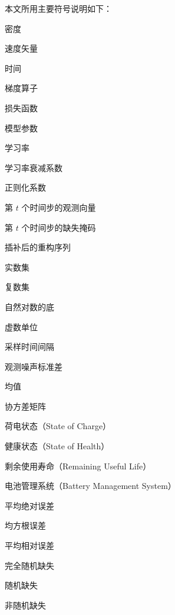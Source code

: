 
\makesymbolnotation

本文所用主要符号说明如下：

\begin{denotation}[2.8cm]
  \item[$\rho$]        密度
  \item[$\mathbf{v}$]  速度矢量
  \item[$t$]           时间
  \item[$\nabla$]      梯度算子
  \item[$\mathcal{L}$] 损失函数
  \item[$\theta$]      模型参数
  \item[$\alpha$]      学习率
  \item[$\eta$]        学习率衰减系数
  \item[$\lambda$]     正则化系数
  \item[$\mathbf{x}_t$] 第 $t$ 个时间步的观测向量
  \item[$\mathbf{m}_t$] 第 $t$ 个时间步的缺失掩码
  \item[$\hat{\mathbf{x}}$] 插补后的重构序列
  \item[$\mathbb{R}$]  实数集
  \item[$\mathbb{C}$]  复数集
  \item[$\mathrm{e}$]  自然对数的底
  \item[$\mathrm{i}$]  虚数单位
  \item[$\Delta t$]    采样时间间隔
  \item[$\sigma$]      观测噪声标准差
  \item[$\mu$]         均值
  \item[$\Sigma$]      协方差矩阵
  \item[$\mathrm{SOC}$] 荷电状态（State of Charge）
  \item[$\mathrm{SOH}$] 健康状态（State of Health）
  \item[$\mathrm{RUL}$] 剩余使用寿命（Remaining Useful Life）
  \item[$\mathrm{BMS}$] 电池管理系统（Battery Management System）
  \item[$\mathrm{MAE}$] 平均绝对误差
  \item[$\mathrm{RMSE}$] 均方根误差
  \item[$\mathrm{MRE}$] 平均相对误差
  \item[$\mathrm{MCAR}$] 完全随机缺失
  \item[$\mathrm{MAR}$]  随机缺失
  \item[$\mathrm{MNAR}$] 非随机缺失

\end{denotation}
